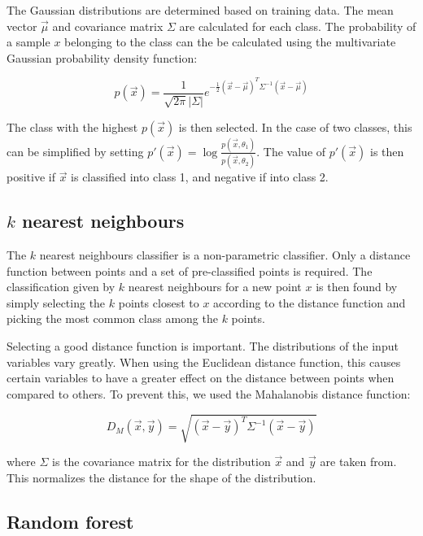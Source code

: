 \documentclass[twoside]{article}
\renewcommand{\v}[1]{\vec{#1}}
\begin{document}
\begin{multicols}{2}
The Gaussian distributions are determined based on training data.
The mean vector $\v{\mu}$ and covariance matrix $\Sigma$ are calculated for each class.
The probability of a sample $x$ belonging to the class can the be calculated
using the multivariate Gaussian probability density function:

\begin{equation}
 p(\v{x}) = \frac{1}{\sqrt{2\pi} |\Sigma|}e^{-\frac{1}{2}(\v{x}-\v{\mu})^T \Sigma^{-1} (\v{x}-\v{\mu})}
\end{equation}

The class with the highest $p(\v{x})$ is then selected. In the case of two classes,
this can be simplified by setting
$p'(\v{x}) = \log \frac{p(\v{x},\theta_1)}{p(\v{x},\theta_2)}$.
The value of $p'(\v{x})$ is then positive if $\v{x}$ is classified into class 1,
and negative if into class 2. 

\subsection{$k$ nearest neighbours}

The $k$ nearest neighbours classifier is a non-parametric classifier. Only a
distance function between points and a set of pre-classified points is required.
The classification given by $k$ nearest neighbours for a new point $x$ is then found by simply
selecting the $k$ points closest to $x$ according to the distance function and
picking the most common class among the $k$ points.

Selecting a good distance function is important. The distributions of the
input variables vary greatly. When using the Euclidean distance function,
this causes certain variables to have a greater effect on the distance between
points when compared to others. To prevent this, we used the Mahalanobis
distance function\cite[p.~88]{Alpaydin}:

\begin{equation}\label{eq:mahalanobis}
  D_M(\v{x}, \v{y}) = \sqrt{(\v{x}-\v{y})^T \Sigma^{-1} (\v{x}-\v{y})}
\end{equation}

where $\Sigma$ is the covariance matrix for the 
distribution $\v{x}$ and $\v{y}$ are taken from.
This normalizes the distance for the shape of the distribution.

\subsection{Random forest}


\end{multicols}
\end{document}
